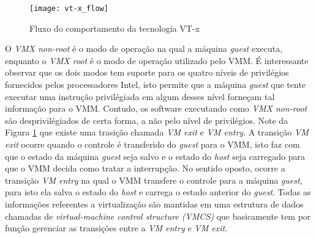 \begin{figure}[!h]
  \centering
  \texttt{[image: vt-x\_flow]} 
  \caption{Fluxo do comportamento da tecnologia VT-x}
  \label{fig:vt-x_flow}
\end{figure}

O \emph{VMX non-root} é o modo de operação na qual a máquina \emph{guest}
executa, enquanto o \emph{VMX root} é o modo de operação utilizado pelo VMM. É
interessante observar que os dois modos tem suporte para os quatro níveis de
privilégios fornecidos pelos processadores Intel, isto permite que a máquina
\emph{guest} que tente executar uma instrução privilégiada em algum desses
nível forneçam tal informação para o VMM. Contudo, os software executando como
\emph{VMX non-root} são desprivilégiados de certa forma, a não pelo nível de
privilégios. Note da Figura \ref{fig:vt-x_flow} que existe uma trasição chamada
\emph{VM exit} e \emph{VM entry}. A transição \emph{VM exit} ocorre quando o
controle é transferido do \emph{guest} para o VMM, isto faz com que o estado da
máquina \emph{guest} seja salvo e o estado do \emph{host} seja carregado para
que o VMM decida como tratar a interrupção. No sentido oposto, ocorre a
transição \emph{VM entry} na qual o VMM transfere o controle para a máquina
\emph{guest}, para isto ela salva o estado do \emph{host} e carrega o estado
anterior do \emph{guest}. Todas as informações referentes a virtualização são
mantidas em uma estrutura de dados chamadas de \emph{virtual-machine control
structure (VMCS)} que basicamente tem por função gerenciar as transições entre
a \emph{VM entry} e \emph{VM exit}.


